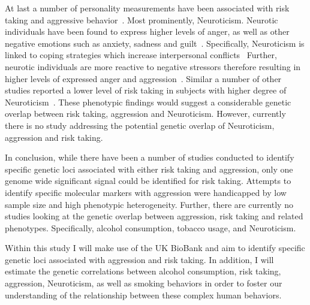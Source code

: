 At last a number of personality measurements have been associated with risk taking and aggressive behavior~\cite{Anderson2002a}.
Most prominently, Neuroticism.
Neurotic individuals have been found to express higher levels of anger, as well as other negative emotions such as anxiety, sadness and guilt~\cite{Watson1984}.
Specifically, Neuroticism is linked to coping strategies which increase interpersonal conflicts~\cite{Bolger1991,Ode2008}
Further, neurotic individuals are more reactive to negative stressors therefore resulting in higher levels of expressed anger and aggression~\cite{Ode2008}.
Similar a number of other studies reported a lower level of risk taking in subjects with higher degree of Neuroticism~\cite{Lauriola2001,InstituteofMedicine2011,Paulus2003}.
These phenotypic findings would suggest a considerable genetic overlap between risk taking, aggression and Neuroticism.
However, currently there is no study addressing the potential genetic overlap of Neuroticism, aggression and risk taking.

In conclusion, while there have been a number of studies conducted to identify specific genetic loci associated  with either risk taking and aggression, only one genome wide significant signal could be identified for risk taking.
Attempts to identify specific molecular markers with aggression were handicapped by low sample size and high phenotypic heterogeneity.
Further, there are currently no studies looking at the genetic overlap between aggression, risk taking and related phenotypes.
Specifically, alcohol consumption, tobacco usage, and Neuroticism.

Within this study I will make use of the UK BioBank and aim to identify specific genetic loci associated with aggression and risk taking.
In addition, I will estimate the genetic correlations between alcohol consumption, risk taking, aggression, Neuroticism, as well as smoking behaviors in order to foster our understanding of the relationship between these complex human behaviors.
